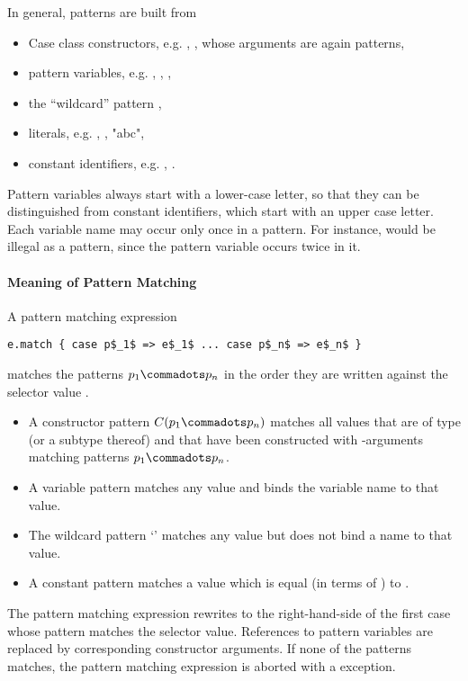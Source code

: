 \documentclass[a4paper,12pt,twoside,titlepage]{book}
\begin{document}
In general, patterns are built from
\begin{itemize}
\item Case class constructors, e.g. , , whose arguments
      are again patterns,
\item pattern variables, e.g. , , ,
\item the ``wildcard'' pattern \code{_},
\item literals, e.g. , , "abc", 
\item constant identifiers, e.g. , .
\end{itemize}
Pattern variables always start with a lower-case letter, so that they
can be distinguished from constant identifiers, which start with an
upper case letter.  Each variable name may occur only once in a
pattern. For instance,  would be illegal as a pattern,
since the pattern variable  occurs twice in it.

\paragraph{Meaning of Pattern Matching}
A pattern matching expression 
\begin{lstlisting}
e.match { case p$_1$ => e$_1$ ... case p$_n$ => e$_n$ }
\end{lstlisting}
matches the patterns $p_1 \commadots p_n$ in the order they
are written against the selector value .
\begin{itemize}
\item
A constructor pattern $C(p_1 \commadots p_n)$ matches all values that
are of type  (or a subtype thereof) and that have been constructed with 
-arguments matching patterns $p_1 \commadots p_n$.
\item 
A variable pattern  matches any value and binds the variable
name to that value.  
\item 
The wildcard pattern `\code{_}' matches any value but does not bind a name to that value. 
\item A constant pattern  matches a value which is
equal (in terms of \code{==}) to .
\end{itemize}
The pattern matching expression rewrites to the right-hand-side of the
first case whose pattern matches the selector value. References to
pattern variables are replaced by corresponding constructor arguments.
If none of the patterns matches, the pattern matching expression is
aborted with a  exception.
\end{document}
